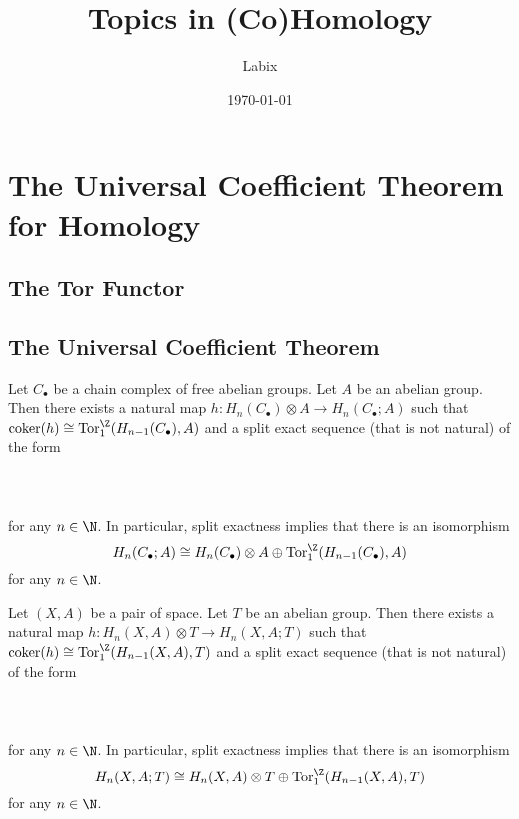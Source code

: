 \documentclass[a4paper]{article}
\title{Topics in (Co)Homology}
\author{Labix}
\date{\today}
\begin{document}
\maketitle
\begin{abstract}
\end{abstract}
\pagebreak
\tableofcontents

\pagebreak
\section{The Universal Coefficient Theorem for Homology}
\subsection{The Tor Functor}
\subsection{The Universal Coefficient Theorem}
\begin{thm}{}{} Let $C_\bullet$ be a chain complex of free abelian groups. Let $A$ be an abelian group. Then there exists a natural map $h:H_n(C_\bullet)\otimes A\to H_n(C_\bullet;A)$ such that $\text{coker}(h)\cong\text{Tor}_1^\Z(H_{n-1}(C_\bullet),A)$ and a split exact sequence (that is not natural) of the form \\~\\
\\~\\
for any $n\in\N$. In particular, split exactness implies that there is an isomorphism $$H_n(C_\bullet;A)\cong H_n(C_\bullet)\otimes A\oplus\text{Tor}_1^\Z(H_{n-1}(C_\bullet),A)$$ for any $n\in\N$. 
\end{thm}

\begin{crl}{}{} Let $(X,A)$ be a pair of space. Let $T$ be an abelian group. Then there exists a natural map $h:H_n(X,A)\otimes T\to H_n(X,A;T)$ such that $\text{coker}(h)\cong\text{Tor}_1^\Z(H_{n-1}(X,A),T)$ and a split exact sequence (that is not natural) of the form \\~\\
\\~\\
for any $n\in\N$. In particular, split exactness implies that there is an isomorphism $$H_n(X,A;T)\cong H_n(X,A)\otimes T\oplus\text{Tor}_1^\Z(H_{n-1}(X,A),T)$$ for any $n\in\N$. 
\end{crl}
\end{document}
